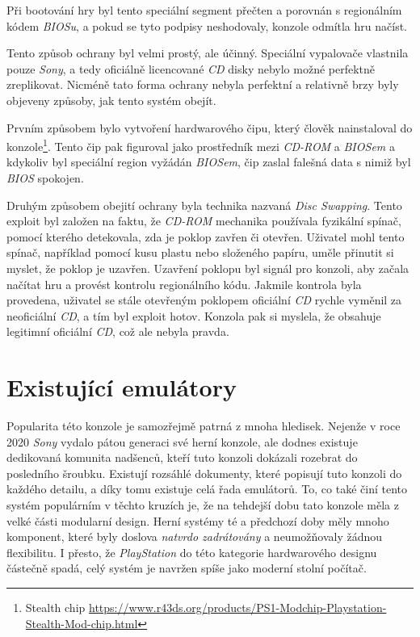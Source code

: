 Při bootování hry byl tento speciální segment přečten a porovnán s regionálním kódem \textit{BIOSu}, 
a pokud se tyto podpisy neshodovaly, konzole odmítla hru načíst.

Tento způsob ochrany byl velmi prostý, ale účinný. Speciální vypalovače vlastnila pouze \textit{Sony}, 
a tedy oficiálně licencované \textit{CD} disky nebylo možné perfektně zreplikovat. 
Nicméně tato forma ochrany nebyla perfektní a relativně brzy byly objeveny způsoby, jak tento systém obejít.

Prvním způsobem bylo vytvoření hardwarového čipu, který člověk nainstaloval do konzole\footnote{Stealth chip \url{https://www.r43ds.org/products/PS1-Modchip-Playstation-Stealth-Mod-chip.html}}. 
Tento čip pak figuroval jako prostředník mezi \textit{CD-ROM} a \textit{BIOSem}
a kdykoliv byl speciální region vyžádán \textit{BIOSem}, čip zaslal falešná data s nimiž byl \textit{BIOS} spokojen.

Druhým způsobem obejití ochrany byla technika nazvaná \textit{Disc Swapping}.
Tento exploit byl založen na faktu, že \textit{CD-ROM} mechanika používala fyzikální spínač, 
pomocí kterého detekovala, zda je poklop zavřen či otevřen. 
Uživatel mohl tento spínač, například pomocí kusu plastu nebo složeného papíru, uměle přinutit si myslet, že poklop je uzavřen. 
Uzavření poklopu byl signál pro konzoli, aby začala načítat hru a provést kontrolu regionálního kódu. 
Jakmile kontrola byla provedena, uživatel se stále otevřeným poklopem oficiální \textit{CD} rychle vyměnil za neoficiální \textit{CD}, 
a tím byl exploit hotov. Konzola pak si myslela, že obsahuje legitimní oficiální \textit{CD}, což ale nebyla pravda.

\section{Existující emulátory}

Popularita této konzole je samozřejmě patrná z mnoha hledisek. 
Nejenže v roce 2020 \textit{Sony} vydalo pátou generaci své herní konzole, 
ale dodnes existuje dedikovaná komunita nadšenců, kteří tuto konzoli dokázali rozebrat do posledního šroubku\cite{PSXSpec}. 
Existují rozsáhlé dokumenty, které popisují tuto konzoli do každého detailu, a díky tomu existuje celá řada emulátorů. 
To, co také činí tento systém populárním v těchto kruzích je, že na tehdejší dobu tato konzole měla z velké části modularní design. 
Herní systémy té a předchozí doby měly mnoho komponent, které byly doslova \textit{natvrdo zadrátovány} a neumožňovaly žádnou flexibilitu. 
I přesto, že \textit{PlayStation} do této kategorie hardwarového designu částečně spadá, celý systém je navržen spíše jako moderní stolní počítač.

